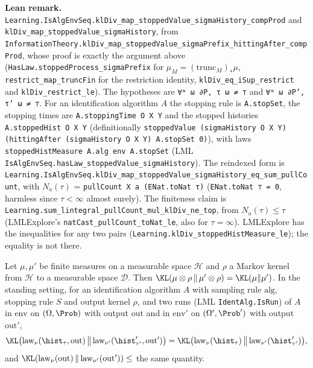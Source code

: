 \textbf{Lean remark.}
\texttt{Learning.IsAlgEnvSeq.klDiv\_map\_stoppedValue\_sigmaHistory\_compProd} and
\texttt{klDiv\_map\_stoppedValue\_sigmaHistory}, from
\texttt{InformationTheory.klDiv\_map\_stoppedValue\_sigmaPrefix\_hittingAfter\_compProd}, whose proof is
exactly the argument above (\texttt{HasLaw.stoppedProcess\_sigmaPrefix} for
$\mu_M = (\mathrm{trunc}_M)_*\mu$, \texttt{restrict\_map\_truncFin} for the restriction
identity, \texttt{klDiv\_eq\_iSup\_restrict} and \texttt{klDiv\_restrict\_le}). The hypotheses
are \texttt{∀ᵐ ω ∂P, τ ω ≠ ⊤} and \texttt{∀ᵐ ω ∂P', τ' ω ≠ ⊤}. For an identification algorithm
$A$ the stopping rule is \texttt{A.stopSet}, the stopping times are \texttt{A.stoppingTime O X Y}
and the stopped histories \texttt{A.stoppedHist O X Y} (definitionally
\texttt{stoppedValue (sigmaHistory O X Y) (hittingAfter (sigmaHistory O X Y) A.stopSet 0)}), with laws
\texttt{stoppedHistMeasure A.alg env A.stopSet} (LML
\texttt{IsAlgEnvSeq.hasLaw\_stoppedValue\_sigmaHistory}). The reindexed form is
\texttt{Learning.IsAlgEnvSeq.klDiv\_map\_stoppedValue\_sigmaHistory\_eq\_sum\_pullCount}, with
$N_a(\tau)$ = \texttt{pullCount X a (ENat.toNat τ)} (\texttt{ENat.toNat ⊤ = 0}, harmless since
$\tau < \infty$ almost surely). The finiteness claim is
\texttt{Learning.sum\_lintegral\_pullCount\_mul\_klDiv\_ne\_top}, from
$N_a(\tau) \le \tau$ (LMLExplore's \texttt{natCast\_pullCount\_toNat\_le}, also for $\tau = \infty$).
LMLExplore has the inequalities for any two pairs (\texttt{Learning.klDiv\_stoppedHistMeasure\_le});
the equality is not there.

\begin{lemma}\label{lem:kl_output_pair}
\leanok
Let $\mu, \mu'$ be finite measures on a measurable space $\mathcal H$ and $\rho$ a Markov kernel
from $\mathcal H$ to a measurable space $\mathcal D$. Then
$\KL(\mu\otimes\rho\,\|\,\mu'\otimes\rho) = \KL(\mu\|\mu')$. In the standing setting, for an
identification algorithm $A$ with sampling rule $\mathrm{alg}$, stopping rule $S$ and output
kernel $\rho$, and two runs (LML \texttt{IdentAlg.IsRun}) of $A$ in $\mathrm{env}$ on
$(\Omega, \Prob)$ with output $\mathrm{out}$ and in $\mathrm{env}'$ on $(\Omega', \Prob')$ with
output $\mathrm{out}'$,
\[
  \KL\big(\mathrm{law}_\nu(\hist_\tau, \mathrm{out})\,\big\|\,\mathrm{law}_{\nu'}(\hist'_{\tau'}, \mathrm{out}')\big)
  = \KL\big(\mathrm{law}_\nu(\hist_\tau)\,\big\|\,\mathrm{law}_{\nu'}(\hist'_{\tau'})\big),
\]
and $\KL(\mathrm{law}_\nu(\mathrm{out})\,\|\,\mathrm{law}_{\nu'}(\mathrm{out}')) \le$ the same
quantity.
\end{lemma}

